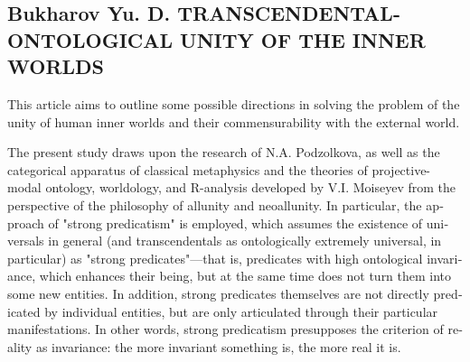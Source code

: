 \ifprintabstract
    \begin{english}
    \subsection{\texorpdfstring{\textbf{Bukharov Yu. D. TRANSCENDENTAL-ONTOLOGICAL UNITY OF THE INNER WORLDS}}{Bukharov Yu. D. TRANSCENDENTAL-ONTOLOGICAL UNITY OF THE INNER WORLDS}}
    \label{subsec:bukharov-en}

    This article aims to outline some possible directions in solving the problem of the unity of human inner worlds and their commensurability with the external world.

    The present study draws upon the research of N.A. Podzolkova, as well as the categorical apparatus of classical metaphysics and the theories of projective-modal ontology, worldology, and R-analysis developed by V.I. Moiseyev from the perspective of the philosophy of allunity and neoallunity. In particular, the approach of "strong predicatism" is employed, which assumes the existence of universals in general (and transcendentals as ontologically extremely universal, in particular) as "strong predicates"—that is, predicates with high ontological invariance, which enhances their being, but at the same time does not turn them into some new entities. In addition, strong predicates themselves are not directly predicated by individual entities, but are only articulated through their particular manifestations. In other words, strong predicatism presupposes the criterion of reality as invariance: the more invariant something is, the more real it is.


\end{english}
